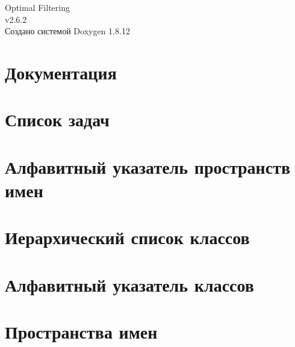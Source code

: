\documentclass[twoside]{book}
\newcommand{\+}{\discretionary{\mbox{\scriptsize$\hookleftarrow$}}{}{}}
\newcommand{\clearemptydoublepage}{%
  \newpage{\pagestyle{empty}\cleardoublepage}%
}
\begin{document}
\hypersetup{pageanchor=false,
             bookmarksnumbered=true,
             pdfencoding=unicode
            }
\begin{titlepage}
\vspace*{7cm}
\begin{center}%
{\Large Optimal Filtering \\[1ex]\large v2.\+6.\+2 }\\
\vspace*{1cm}
{\large Создано системой Doxygen 1.8.12}\\
\end{center}
\end{titlepage}
\clearemptydoublepage
{}
\tableofcontents
\clearemptydoublepage
{}
\hypersetup{pageanchor=true}

\chapter{Документация}
\label{index}\hypertarget{index}{}
\chapter{Список задач}
\label{todo}
\hypertarget{todo}{}

\chapter{Алфавитный указатель пространств имен}

\chapter{Иерархический список классов}

\chapter{Алфавитный указатель классов}

\chapter{Пространства имен}














\end{document}

